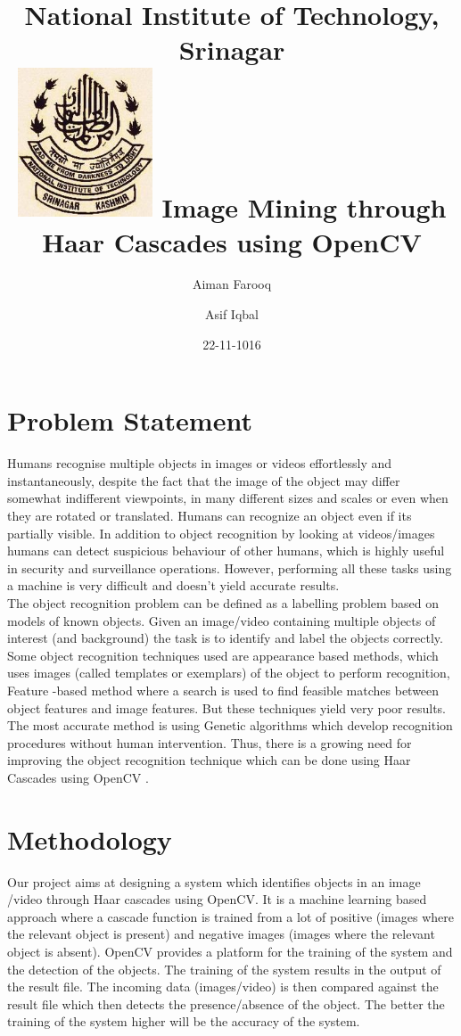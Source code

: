 \documentclass{article}
\title{\textbf{National Institute of Technology, Srinagar}\\
    \vfill
    \includegraphics[width=4cm]{nitlogo.jpg}
    \vfill
Image Mining through Haar Cascades using OpenCV\vspace*{2.0cm}}
\date{22-11-1016}
\author{
  Aiman Farooq
  \and
  Asif Iqbal
}
\begin{document}
\maketitle
\newpage
{}

\tableofcontents
\newpage

\onehalfspacing

\section{Problem Statement}

Humans recognise multiple objects in images or videos effortlessly and instantaneously, despite the fact that the image of the object may differ somewhat indifferent viewpoints, in many different sizes and scales or even when they are rotated or translated. Humans can recognize an object even if its partially visible.  In addition to object recognition by looking at videos/images humans can detect suspicious behaviour of other humans, which is highly useful in security and surveillance operations. However, performing all these tasks using a machine is very difficult and doesn’t yield accurate results. \\

The object recognition problem can be defined as a labelling problem based on models of known objects. Given an image/video containing multiple objects of interest (and background) the task is to identify and label the objects correctly. Some object recognition techniques used are appearance based methods, which uses images (called templates or exemplars) of the object to perform recognition, Feature -based method where a search is used to find feasible matches between object features and image features. But these techniques yield very poor results. The most accurate method is using Genetic algorithms which develop recognition procedures without human intervention. Thus, there is a growing need for improving the object recognition technique which can be done using Haar Cascades using OpenCV \cite{ID:1}.

\section{Methodology}

Our project aims at designing a system which identifies objects in an image /video through Haar cascades using OpenCV. It is a machine learning based approach where a cascade function is trained from a lot of positive (images where the relevant object is present) and negative images (images where the relevant object is absent). OpenCV provides a platform for the training of the system and the detection of the objects. The training of the system results in the output of the result file. The incoming data (images/video) is then compared against the result file which then detects the presence/absence of the object. The better the training of the system higher will be the accuracy of the system.
\end{document}
